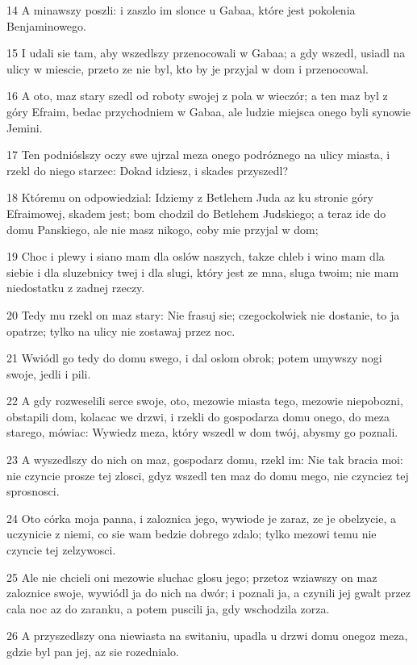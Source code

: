 \par 14 A minawszy poszli: i zaszlo im slonce u Gabaa, które jest pokolenia Benjaminowego.
\par 15 I udali sie tam, aby wszedlszy przenocowali w Gabaa; a gdy wszedl, usiadl na ulicy w miescie, przeto ze nie byl, kto by je przyjal w dom i przenocowal.
\par 16 A oto, maz stary szedl od roboty swojej z pola w wieczór; a ten maz byl z góry Efraim, bedac przychodniem w Gabaa, ale ludzie miejsca onego byli synowie Jemini.
\par 17 Ten podnióslszy oczy swe ujrzal meza onego podróznego na ulicy miasta, i rzekl do niego starzec: Dokad idziesz, i skades przyszedl?
\par 18 Któremu on odpowiedzial: Idziemy z Betlehem Juda az ku stronie góry Efraimowej, skadem jest; bom chodzil do Betlehem Judskiego; a teraz ide do domu Panskiego, ale nie masz nikogo, coby mie przyjal w dom;
\par 19 Choc i plewy i siano mam dla oslów naszych, takze chleb i wino mam dla siebie i dla sluzebnicy twej i dla slugi, który jest ze mna, sluga twoim; nie mam niedostatku z zadnej rzeczy.
\par 20 Tedy mu rzekl on maz stary: Nie frasuj sie; czegockolwiek nie dostanie, to ja opatrze; tylko na ulicy nie zostawaj przez noc.
\par 21 Wwiódl go tedy do domu swego, i dal oslom obrok; potem umywszy nogi swoje, jedli i pili.
\par 22 A gdy rozweselili serce swoje, oto, mezowie miasta tego, mezowie niepobozni, obstapili dom, kolacac we drzwi, i rzekli do gospodarza domu onego, do meza starego, mówiac: Wywiedz meza, który wszedl w dom twój, abysmy go poznali.
\par 23 A wyszedlszy do nich on maz, gospodarz domu, rzekl im: Nie tak bracia moi: nie czyncie prosze tej zlosci, gdyz wszedl ten maz do domu mego, nie czynciez tej sprosnosci.
\par 24 Oto córka moja panna, i zaloznica jego, wywiode je zaraz, ze je obelzycie, a uczynicie z niemi, co sie wam bedzie dobrego zdalo; tylko mezowi temu nie czyncie tej zelzywosci.
\par 25 Ale nie chcieli oni mezowie sluchac glosu jego; przetoz wziawszy on maz zaloznice swoje, wywiódl ja do nich na dwór; i poznali ja, a czynili jej gwalt przez cala noc az do zaranku, a potem puscili ja, gdy wschodzila zorza.
\par 26 A przyszedlszy ona niewiasta na switaniu, upadla u drzwi domu onegoz meza, gdzie byl pan jej, az sie rozednialo.
